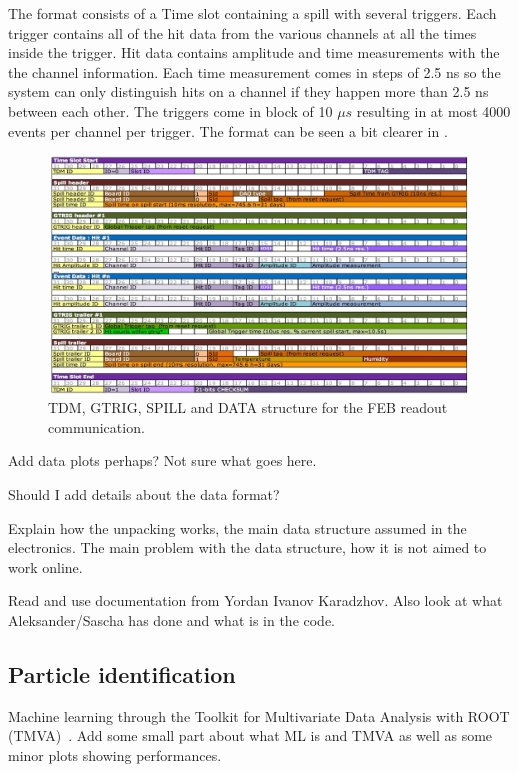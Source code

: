The format consists of a Time slot containing a spill with several triggers. Each trigger contains all of the hit data from the various channels at all the times inside the trigger. Hit data contains amplitude and time measurements with the the channel information.
Each time measurement comes in steps of 2.5 ns so the system can only distinguish hits on a channel if they happen more than 2.5 ns between each other. The triggers come in block of 10 $\mu s$ resulting in at most 4000 events per channel per trigger. The format can be seen a bit clearer in .


\begin{figure}[h!]
\centering
\includegraphics[width=\textwidth]{figures/febstructure.jpeg}
\caption{TDM, GTRIG, SPILL and DATA structure for the FEB readout communication.}
\label{fig:FEBstructure}
\end{figure}

Add data plots perhaps? Not sure what goes here.

Should I add details about the data format?

Explain how the unpacking works, the main data structure assumed in the electronics. The main problem with the data structure, how it is not aimed to work online. 

Read and use documentation from Yordan Ivanov Karadzhov. Also look at what Aleksander/Sascha has done and what is in the code.


\subsection{Particle identification}
Machine learning through the Toolkit for Multivariate Data Analysis with ROOT (TMVA)~\cite{TMVA}. Add some small part about what ML is and TMVA as well as some minor plots showing performances.

